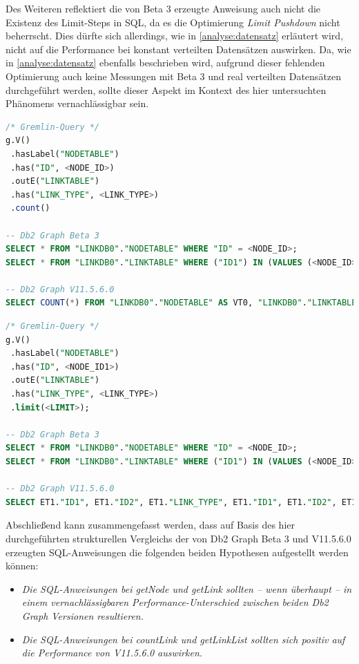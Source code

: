 Des Weiteren reflektiert die von Beta 3 erzeugte Anweisung auch nicht die Existenz des Limit-Steps in SQL, da es die Optimierung \textit{Limit Pushdown} nicht beherrscht. Dies dürfte sich allerdings, wie in \autoref{analyse:datensatz} erläutert wird, nicht auf die Performance bei konstant verteilten Datensätzen auswirken. Da, wie in \autoref{analyse:datensatz} ebenfalls beschrieben wird, aufgrund dieser fehlenden Optimierung auch keine Messungen mit Beta 3 und real verteilten Datensätzen durchgeführt werden, sollte dieser Aspekt im Kontext des hier untersuchten Phänomens vernachlässigbar sein. 
\begin{lstlisting}[caption={Generierter SQL-Code countLink},label=src:sql_countlink,language=SQL]
/* Gremlin-Query */
g.V()
 .hasLabel("NODETABLE")
 .has("ID", <NODE_ID>)
 .outE("LINKTABLE")
 .has("LINK_TYPE", <LINK_TYPE>)
 .count()

-- Db2 Graph Beta 3
SELECT * FROM "LINKDB0"."NODETABLE" WHERE "ID" = <NODE_ID>;
SELECT * FROM "LINKDB0"."LINKTABLE" WHERE ("ID1") IN (VALUES (<NODE_ID>)) AND "LINK_TYPE" = <LINK_TYPE>;

-- Db2 Graph V11.5.6.0
SELECT COUNT(*) FROM "LINKDB0"."NODETABLE" AS VT0, "LINKDB0"."LINKTABLE" AS ET1 WHERE VT0."ID" = <NODE_ID> AND ET1."LINK_TYPE" = <LINK_TYPE> AND VT0.ID = ET1.ID1
\end{lstlisting}

\begin{lstlisting}[caption={Generierter SQL-Code getLinkList},label=src:sql_getlinklist,language=SQL]
/* Gremlin-Query */
g.V()
 .hasLabel("NODETABLE")
 .has("ID", <NODE_ID1>)
 .outE("LINKTABLE")
 .has("LINK_TYPE", <LINK_TYPE>)
 .limit(<LIMIT>);

-- Db2 Graph Beta 3
SELECT * FROM "LINKDB0"."NODETABLE" WHERE "ID" = <NODE_ID>;
SELECT * FROM "LINKDB0"."LINKTABLE" WHERE ("ID1") IN (VALUES (<NODE_ID>)) AND "LINK_TYPE" = <LINK_TYPE>;

-- Db2 Graph V11.5.6.0
SELECT ET1."ID1", ET1."ID2", ET1."LINK_TYPE", ET1."ID1", ET1."ID2", ET1."VISIBILITY", ET1."LINK_TYPE", ET1."DATA", ET1."ID2", ET1."ID1", ET1."VERSION", ET1."TIME" FROM "LINKDB0"."NODETABLE" AS VT0, "LINKDB0"."LINKTABLE" AS ET1 WHERE VT0."ID" = <NODE_ID> AND ET1."LINK_TYPE" = <LINK_TYPE> AND VT0.ID = ET1.ID1 FETCH FIRST <LIMIT> ROWS ONLY;
\end{lstlisting}

Abschließend kann zusammengefasst werden, dass auf Basis des hier durchgeführten strukturellen Vergleichs der von Db2 Graph Beta 3 und V11.5.6.0 erzeugten SQL-Anweisungen die folgenden beiden Hypothesen aufgestellt werden können:
\begin{itemize}
    \item \textit{Die SQL-Anweisungen bei getNode und getLink sollten -- wenn überhaupt -- in einem vernachlässigbaren Performance-Unterschied zwischen beiden Db2 Graph Versionen resultieren.}
    \item  \textit{Die SQL-Anweisungen bei countLink und getLinkList sollten sich  positiv auf die Performance von V11.5.6.0 auswirken.}
\end{itemize}

